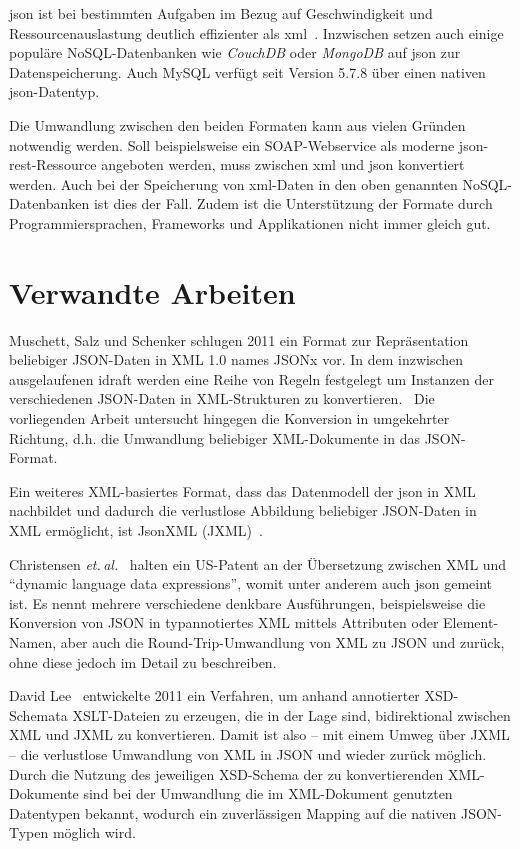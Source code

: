 \acrshort{json} ist bei bestimmten Aufgaben im Bezug auf Geschwindigkeit und
Ressourcenauslastung deutlich effizienter als \acrshort{xml}~\cite{nurseitov2009comparison}\@.
Inzwischen setzen auch einige populäre NoSQL-Datenbanken wie
\emph{CouchDB} oder \emph{MongoDB} auf \acrshort{json} zur Datenspeicherung. Auch
MySQL verfügt seit Version 5.7.8 über einen nativen \acrshort{json}-Datentyp.

Die Umwandlung zwischen den beiden Formaten kann aus vielen Gründen
notwendig werden. Soll beispielsweise ein SOAP-Webservice als moderne
\acrshort{json}-\acrshort{rest}-Ressource angeboten werden, muss zwischen \acrshort{xml} und \acrshort{json} konvertiert
werden. Auch bei der Speicherung von \acrshort{xml}-Daten in den oben genannten NoSQL-Datenbanken
ist dies der Fall. Zudem ist die Unterstützung der Formate durch
Programmiersprachen, Frameworks und Applikationen nicht immer gleich gut.

\section{Verwandte Arbeiten}

Muschett, Salz und Schenker schlugen 2011 ein Format zur Repräsentation beliebiger JSON-Daten in XML 1.0 names JSONx vor. In dem inzwischen ausgelaufenen \gls{idraft} werden eine Reihe von Regeln festgelegt um Instanzen der verschiedenen JSON-Daten in XML-Strukturen zu konvertieren.~\cite{jsonx} Die vorliegenden Arbeit untersucht hingegen die Konversion in umgekehrter Richtung, d.h. die Umwandlung beliebiger XML-Dokumente in das JSON-Format.

Ein weiteres XML-basiertes Format, dass das Datenmodell der \acrfull{json} in XML nachbildet und dadurch die verlustlose Abbildung beliebiger JSON-Daten in XML ermöglicht, ist JsonXML (JXML)~\cite{jxml}.

Christensen \emph{et.\,al.}~\cite{US7761484} halten ein US-Patent an der Übersetzung zwischen XML und \enquote{dynamic language data expressions}, womit unter anderem auch \acrshort{json} gemeint ist. Es nennt mehrere verschiedene denkbare Ausführungen, beispielsweise die Konversion von JSON in typannotiertes XML mittels Attributen oder Element-Namen, aber auch die Round-Trip-Umwandlung von XML zu JSON und zurück, ohne diese jedoch im Detail zu beschreiben.

David Lee~\cite{lee2011jxon} entwickelte 2011 ein Verfahren, um anhand annotierter XSD-Schemata XSLT-Dateien zu erzeugen, die in der Lage sind, bidirektional zwischen XML und JXML zu konvertieren.  Damit ist also -- mit einem Umweg über JXML -- die verlustlose Umwandlung von XML in JSON und wieder zurück möglich.
Durch die Nutzung des jeweiligen XSD-Schema der zu konvertierenden XML-Dokumente sind bei der Umwandlung die im XML-Dokument genutzten Datentypen bekannt, wodurch ein zuverlässigen Mapping auf die nativen JSON-Typen möglich wird.

